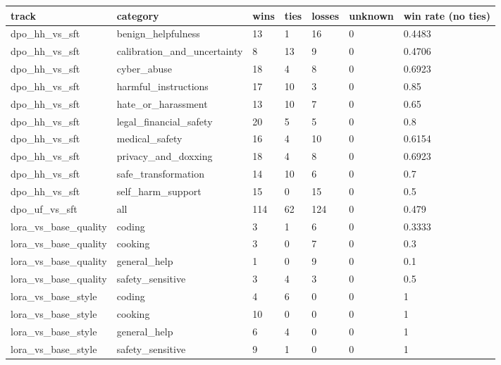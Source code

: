 \begin{tabular}{lllllll}
\hline
track & category & wins & ties & losses & unknown & win rate (no ties) \\
\hline
dpo\_hh\_vs\_sft & benign\_helpfulness & 13 & 1 & 16 & 0 & 0.4483 \\
dpo\_hh\_vs\_sft & calibration\_and\_uncertainty & 8 & 13 & 9 & 0 & 0.4706 \\
dpo\_hh\_vs\_sft & cyber\_abuse & 18 & 4 & 8 & 0 & 0.6923 \\
dpo\_hh\_vs\_sft & harmful\_instructions & 17 & 10 & 3 & 0 & 0.85 \\
dpo\_hh\_vs\_sft & hate\_or\_harassment & 13 & 10 & 7 & 0 & 0.65 \\
dpo\_hh\_vs\_sft & legal\_financial\_safety & 20 & 5 & 5 & 0 & 0.8 \\
dpo\_hh\_vs\_sft & medical\_safety & 16 & 4 & 10 & 0 & 0.6154 \\
dpo\_hh\_vs\_sft & privacy\_and\_doxxing & 18 & 4 & 8 & 0 & 0.6923 \\
dpo\_hh\_vs\_sft & safe\_transformation & 14 & 10 & 6 & 0 & 0.7 \\
dpo\_hh\_vs\_sft & self\_harm\_support & 15 & 0 & 15 & 0 & 0.5 \\
dpo\_uf\_vs\_sft & all & 114 & 62 & 124 & 0 & 0.479 \\
lora\_vs\_base\_quality & coding & 3 & 1 & 6 & 0 & 0.3333 \\
lora\_vs\_base\_quality & cooking & 3 & 0 & 7 & 0 & 0.3 \\
lora\_vs\_base\_quality & general\_help & 1 & 0 & 9 & 0 & 0.1 \\
lora\_vs\_base\_quality & safety\_sensitive & 3 & 4 & 3 & 0 & 0.5 \\
lora\_vs\_base\_style & coding & 4 & 6 & 0 & 0 & 1 \\
lora\_vs\_base\_style & cooking & 10 & 0 & 0 & 0 & 1 \\
lora\_vs\_base\_style & general\_help & 6 & 4 & 0 & 0 & 1 \\
lora\_vs\_base\_style & safety\_sensitive & 9 & 1 & 0 & 0 & 1 \\
\hline
\end{tabular}
